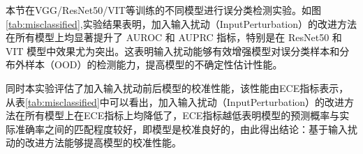 本节在VGG/ResNet50/VIT等训练的不同模型进行误分类检测实验。如图\ref{tab:misclassified},实验结果表明，加入输入扰动（InputPerturbation）的改进方法在所有模型上均显著提升了 AUROC 和 AUPRC 指标，特别是在 ResNet50 和 VIT 模型中效果尤为突出。这表明输入扰动能够有效增强模型对误分类样本和分布外样本（OOD）的检测能力，提高模型的不确定性估计性能。

同时本实验评估了加入输入扰动前后模型的校准性能，该性能由ECE指标表示，从表\ref{tab:misclassified}中可以看出，加入输入扰动（InputPerturbation）的改进方法在所有模型上在ECE指标上均降低了，ECE指标越低表明模型的预测概率与实际准确率之间的匹配程度较好，即模型是校准良好的，由此得出结论：基于输入扰动的改进方法能够提高模型的校准性能。
\begin{table}[h]
    \captionsetup{font=small, justification=centering}
    \centering
    \renewcommand{\arraystretch}{1.0} %
    \caption{误分类样本识别任务，实验结果在不同的模型(VGG16、ResNet50、VIT)上做实验对比DDU和基于输入扰动的改进方法对模型不确定性的建模效果，报告指标是AUROC($\uparrow$) / AUPRC($\uparrow$)/ECE($\downarrow$)}
    \label{tab:misclassified}
\end{table}



